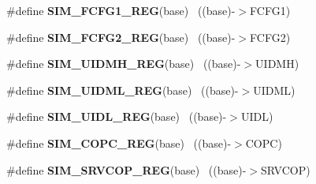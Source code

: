 \begin{DoxyCompactItemize}
\item 
\hypertarget{group___s_i_m___register___accessor___macros_ga6cc80fd9f1edfd8f709d2c8fe3c97080}{}\#define {\bfseries S\+I\+M\+\_\+\+F\+C\+F\+G1\+\_\+\+R\+E\+G}(base)                                        ~((base)-\/$>$F\+C\+F\+G1)\label{group___s_i_m___register___accessor___macros_ga6cc80fd9f1edfd8f709d2c8fe3c97080}

\item 
\hypertarget{group___s_i_m___register___accessor___macros_ga8e1caad19971280346dc9c767c8f4b6e}{}\#define {\bfseries S\+I\+M\+\_\+\+F\+C\+F\+G2\+\_\+\+R\+E\+G}(base)                                        ~((base)-\/$>$F\+C\+F\+G2)\label{group___s_i_m___register___accessor___macros_ga8e1caad19971280346dc9c767c8f4b6e}

\item 
\hypertarget{group___s_i_m___register___accessor___macros_gaffd69cc3f48c0e204d8c659424b4c51d}{}\#define {\bfseries S\+I\+M\+\_\+\+U\+I\+D\+M\+H\+\_\+\+R\+E\+G}(base)                                        ~((base)-\/$>$U\+I\+D\+M\+H)\label{group___s_i_m___register___accessor___macros_gaffd69cc3f48c0e204d8c659424b4c51d}

\item 
\hypertarget{group___s_i_m___register___accessor___macros_gaac80320f7e56ccd1cd6b54cfdc322430}{}\#define {\bfseries S\+I\+M\+\_\+\+U\+I\+D\+M\+L\+\_\+\+R\+E\+G}(base)                                        ~((base)-\/$>$U\+I\+D\+M\+L)\label{group___s_i_m___register___accessor___macros_gaac80320f7e56ccd1cd6b54cfdc322430}

\item 
\hypertarget{group___s_i_m___register___accessor___macros_ga50225b2615456e0a763efbe4ec59b077}{}\#define {\bfseries S\+I\+M\+\_\+\+U\+I\+D\+L\+\_\+\+R\+E\+G}(base)                                          ~((base)-\/$>$U\+I\+D\+L)\label{group___s_i_m___register___accessor___macros_ga50225b2615456e0a763efbe4ec59b077}

\item 
\hypertarget{group___s_i_m___register___accessor___macros_gab3c5aa73f8b7dba19392b28a0382dd23}{}\#define {\bfseries S\+I\+M\+\_\+\+C\+O\+P\+C\+\_\+\+R\+E\+G}(base)                                          ~((base)-\/$>$C\+O\+P\+C)\label{group___s_i_m___register___accessor___macros_gab3c5aa73f8b7dba19392b28a0382dd23}

\item 
\hypertarget{group___s_i_m___register___accessor___macros_ga84c95ed7ac4a9dca471233c65ae24959}{}\#define {\bfseries S\+I\+M\+\_\+\+S\+R\+V\+C\+O\+P\+\_\+\+R\+E\+G}(base)                                      ~((base)-\/$>$S\+R\+V\+C\+O\+P)\label{group___s_i_m___register___accessor___macros_ga84c95ed7ac4a9dca471233c65ae24959}


\end{DoxyCompactItemize}
